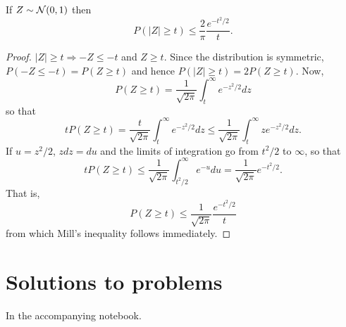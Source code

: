 \documentclass{article}
\begin{document}
\begin{thm}\label{c4t5}
If $Z \sim \mathcal{N}(0, 1)$ then
\[
P(|Z| \ge t) \le \frac{2}{\pi}\frac{e^{-t^2/2}}{t}.
\]
\end{thm}
\begin{proof}
$|Z| \ge t \Rightarrow -Z \le -t$ and $Z \ge t$. Since the distribution is 
symmetric, $P(-Z \le -t) = P(Z \ge t)$ and hence $P(|Z| \ge t) = 2P(Z \ge t)$.
Now,
\[
P(Z \ge t) = \frac{1}{\sqrt{2\pi}}\int_t^\infty e^{-z^2/2}dz
\]
so that
\[
tP(Z \ge t) = \frac{t}{\sqrt{2\pi}}\int_t^\infty e^{-z^2/2}dz 
\le \frac{1}{\sqrt{2\pi}}\int_t^\infty ze^{-z^2/2}dz.
\] 
If $u = z^2/2$, $zdz = du$ and the limits of integration go from $t^2/2$ to 
$\infty$, so that
\[
tP(Z \ge t) \le \frac{1}{\sqrt{2\pi}}\int_{t^2/2}^\infty e^{-u}du = 
\frac{1}{\sqrt{2\pi}}e^{-t^2/2}.
\]
That is,
\[
P(Z \ge t) \le \frac{1}{\sqrt{2\pi}}\frac{e^{-t^2/2}}{t}
\]
from which Mill's inequality follows immediately.
\end{proof}

\section{Solutions to problems}
In the accompanying notebook.
\end{document}
